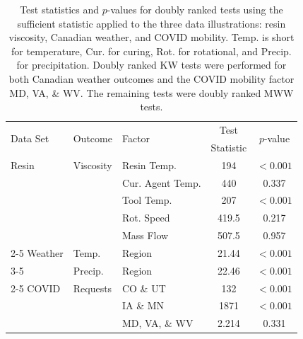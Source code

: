 \documentclass[12pt]{article}
\theoremstyle{plain}
\theoremstyle{remark}
\begin{document}
\begin{table}
\centering
\caption{ Test statistics and $p$-values for doubly ranked tests using the sufficient statistic applied to the three data illustrations: resin viscosity, Canadian weather, and COVID mobility. Temp. is short for temperature, Cur. for curing, Rot. for rotational, and Precip. for precipitation. Doubly ranked KW tests were performed for both Canadian weather outcomes and the COVID mobility factor MD, VA, \& WV. The remaining tests were doubly ranked MWW tests. \label{t:data}}
\vspace{5pt}
\begin{tabular}{lllcc}
  \hline
\multirow{2}{*}{Data Set} & \multirow{2}{*}{Outcome} & \multirow{2}{*}{Factor} &  Test & \multirow{2}{*}{$p$-value}  \\
 &   &  & Statistic &  \\ 
  \hline
Resin & 
Viscosity  &  Resin Temp. & 194 & $<0.001$   \\
 & & Cur. Agent Temp. & 440 & 0.337   \\
 & & Tool Temp. & 207 & $<0.001$   \\
& & Rot. Speed & 419.5 & 0.217  \\
& & Mass Flow  & 507.5 & 0.957  \\
\cline{2-5}
Weather & Temp.  &  Region & 21.44 & $<0.001$   \\
\cline{3-5}
& Precip.  &  Region & 22.46 & $<0.001$  \\ 
\cline{2-5}
COVID & Requests & CO \& UT & 132 & $<0.001$  \\
 & & IA \& MN & 1871 & $<0.001$ \\
 & & MD, VA, \& WV & 2.214 & 0.331   \\
    \hline
\end{tabular}
\end{table}
\end{document}
